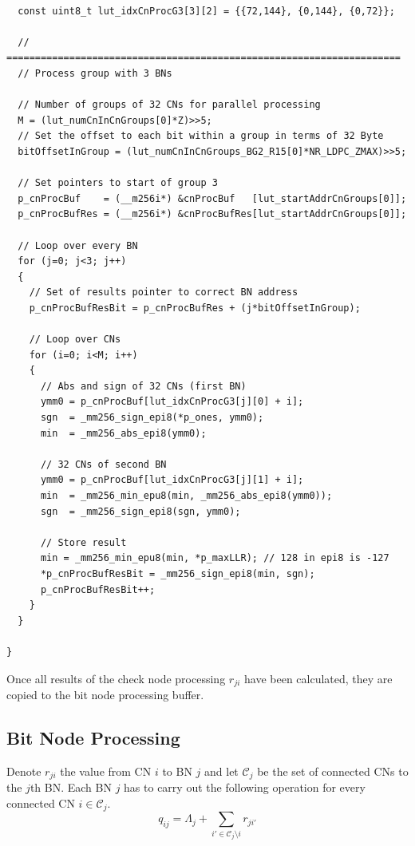 \documentclass{article}
\def\Ccal{\mathcal{C}}
\begin{document}
\begin{lstlisting}[frame=single,caption={Example of CN processing for group 3 from \texttt{cnProc}.},label=code_cnproc]  % Start your code-block

  const uint8_t lut_idxCnProcG3[3][2] = {{72,144}, {0,144}, {0,72}};

  // =====================================================================
  // Process group with 3 BNs

  // Number of groups of 32 CNs for parallel processing
  M = (lut_numCnInCnGroups[0]*Z)>>5;
  // Set the offset to each bit within a group in terms of 32 Byte
  bitOffsetInGroup = (lut_numCnInCnGroups_BG2_R15[0]*NR_LDPC_ZMAX)>>5;

  // Set pointers to start of group 3
  p_cnProcBuf    = (__m256i*) &cnProcBuf   [lut_startAddrCnGroups[0]];
  p_cnProcBufRes = (__m256i*) &cnProcBufRes[lut_startAddrCnGroups[0]];

  // Loop over every BN
  for (j=0; j<3; j++)
  {
    // Set of results pointer to correct BN address
    p_cnProcBufResBit = p_cnProcBufRes + (j*bitOffsetInGroup);

    // Loop over CNs
    for (i=0; i<M; i++)
    {
      // Abs and sign of 32 CNs (first BN)
      ymm0 = p_cnProcBuf[lut_idxCnProcG3[j][0] + i];
      sgn  = _mm256_sign_epi8(*p_ones, ymm0);
      min  = _mm256_abs_epi8(ymm0);

      // 32 CNs of second BN
      ymm0 = p_cnProcBuf[lut_idxCnProcG3[j][1] + i];
      min  = _mm256_min_epu8(min, _mm256_abs_epi8(ymm0));
      sgn  = _mm256_sign_epi8(sgn, ymm0);

      // Store result
      min = _mm256_min_epu8(min, *p_maxLLR); // 128 in epi8 is -127
      *p_cnProcBufResBit = _mm256_sign_epi8(min, sgn);
      p_cnProcBufResBit++;
    }
  }

}
\end{lstlisting}

Once all results of the check node processing $r_{ji}$ have been calculated, they are copied to the bit node processing buffer.

\subsection{Bit Node Processing}
\label{sec:bit-node-processing}

Denote $r_{ji}$ the value from CN $i$ to BN $j$ and let $\Ccal_j$ be the set of connected CNs to the $j$th BN. Each BN $j$ has to carry out the following operation for every connected CN $i\in\Ccal_j$.
\begin{equation}
  \label{eq:46}
  q_{ij} = \Lambda_j + \sum_{i'\in\Ccal_j\setminus i}r_{ji'}
\end{equation}
\end{document}
